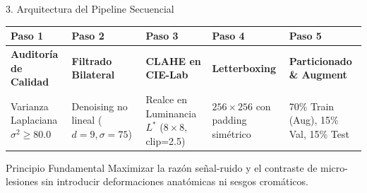 \documentclass[aspectratio=169,10pt]{beamer}
\begin{document}
\begin{frame}{3. Arquitectura del Pipeline Secuencial}
    \centering
    \begin{tabularx}{\textwidth}{>{\centering\arraybackslash}X >{\centering\arraybackslash}X >{\centering\arraybackslash}X >{\centering\arraybackslash}X >{\centering\arraybackslash}X}
        \toprule
        \textbf{Paso 1} & \textbf{Paso 2} & \textbf{Paso 3} & \textbf{Paso 4} & \textbf{Paso 5} \\
        \midrule
        \textbf{Auditoría de Calidad} & \textbf{Filtrado Bilateral} & \textbf{CLAHE en CIE-Lab} & \textbf{Letterboxing} & \textbf{Particionado \& Augment} \\
        \footnotesize Varianza Laplaciana $\sigma^2 \ge 80.0$ & \footnotesize Denoising no lineal ($d=9, \sigma=75$) & \footnotesize Realce en Luminancia $L^*$ ($8\times8$, clip=2.5) & \footnotesize $256\times256$ con padding simétrico & \footnotesize 70\% Train (Aug), 15\% Val, 15\% Test \\
        \bottomrule
    \end{tabularx}
    \vspace{0.4cm}
    \begin{block}{Principio Fundamental}
        Maximizar la razón señal-ruido y el contraste de micro-lesiones sin introducir deformaciones anatómicas ni sesgos cromáticos.
    \end{block}
\end{frame}
\end{document}
